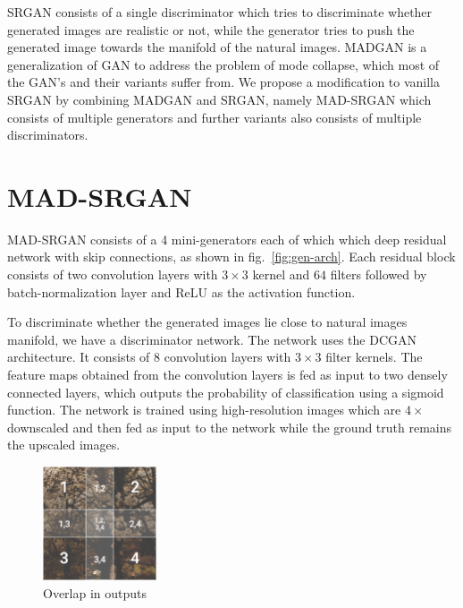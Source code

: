 \documentclass[12pt,a4paper,twocolumn]{article}
\begin{document}
        SRGAN consists of a single discriminator which tries to discriminate whether generated images are realistic or not, while the generator tries to push the generated image towards the manifold of the natural images.
        MADGAN \cite{madgan} is a generalization of GAN to address the problem of mode collapse, which most of the GAN's and their variants suffer from.
        We propose a modification to vanilla SRGAN by combining MADGAN and SRGAN, namely MAD-SRGAN which consists of multiple generators and further variants also consists of multiple discriminators.

    \section{MAD-SRGAN}
        MAD-SRGAN consists of a 4 mini-generators each of which which deep residual network \cite{resnet} with skip connections, as shown in fig.~\ref{fig:gen-arch}.
        Each residual block consists of two convolution layers with $3\times3$ kernel and $64$ filters followed by batch-normalization \cite{batch-norm} layer and ReLU as the activation function.

        To discriminate whether the generated images lie close to natural images manifold, we have a discriminator network.
        The network uses the DCGAN \cite{dcgan} architecture.
        It consists of 8 convolution layers with $3\times3$ filter kernels.
        The feature maps obtained from the convolution layers is fed as input to two densely connected layers, which outputs the probability of classification using a sigmoid function.
        The network is trained using high-resolution images which are $4\times$ downscaled and then fed as input to the network while the ground truth remains the upscaled images.

        \begin{figure}
            \centering
            \includegraphics[width=0.3\textwidth]{images/overlap.png}
            \caption{Overlap in outputs}
            \label{fig:overlap}
        \end{figure}
\end{document}
